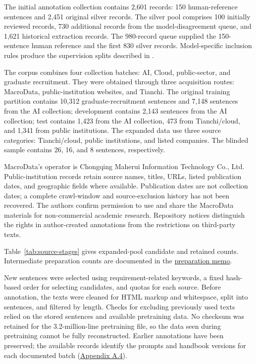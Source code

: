 The initial annotation collection contains 2,601 records: 150 human-reference sentences and 2,451 original silver records. The silver pool comprises 100 initially reviewed records, 730 additional records from the model-disagreement queue, and 1,621 historical extraction records. The 980-record queue supplied the 150-sentence human reference and the first 830 silver records. Model-specific inclusion rules produce the supervision splits described in .

The corpus combines four collection batches: AI, Cloud, public-sector, and graduate recruitment. They were obtained through three acquisition routes: MacroData, public-institution websites, and Tianchi. The original training partition contains 10,312 graduate-recruitment sentences and 7,148 sentences from the AI collection; development contains 2,143 sentences from the AI collection; test contains 1,423 from the AI collection, 473 from Tianchi/cloud, and 1,341 from public institutions. The expanded data use three source categories: Tianchi/cloud, public institutions, and listed companies. The blinded sample contains 26, 16, and 8 sentences, respectively.

MacroData's operator is Chongqing Maherui Information Technology Co., Ltd. Public-institution records retain source names, titles, URLs, listed publication dates, and geographic fields where available. Publication dates are not collection dates; a complete crawl-window and source-exclusion history has not been recovered. The authors confirm permission to use and share the MacroData materials for non-commercial academic research. Repository notices distinguish the rights in author-created annotations from the restrictions on third-party texts.

Table~\ref{tab:source-stages} gives expanded-pool candidate and retained counts. Intermediate preparation counts are documented in the \href{https://github.com/AlfredJamesLi/chinese-skillspan-benchmark/tree/main/reproduction/reviewer_revision_20261005}{preparation memo}.



New sentences were selected using requirement-related keywords, a fixed hash-based order for selecting candidates, and quotas for each source. Before annotation, the texts were cleaned for HTML markup and whitespace, split into sentences, and filtered by length. Checks for excluding previously used texts relied on the stored sentences and available pretraining data. No checksum was retained for the 3.2-million-line pretraining file, so the data seen during pretraining cannot be fully reconstructed. Earlier annotations have been preserved; the available records identify the prompts and handbook versions for each documented batch (\hyperref[sec:guide-version-history]{Appendix A.4}).

